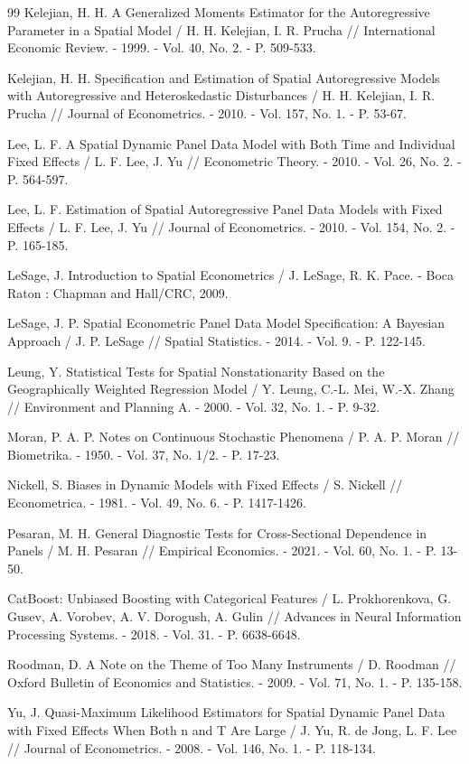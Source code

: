 \documentclass[12pt, a4paper]{article}
\begin{document}
\begin{thebibliography}{99}
    Kelejian, H. H. A Generalized Moments Estimator for the Autoregressive Parameter in a Spatial Model / H. H. Kelejian, I. R. Prucha // International Economic Review. - 1999. - Vol. 40, No. 2. - P. 509-533.

    Kelejian, H. H. Specification and Estimation of Spatial Autoregressive Models with Autoregressive and Heteroskedastic Disturbances / H. H. Kelejian, I. R. Prucha // Journal of Econometrics. - 2010. - Vol. 157, No. 1. - P. 53-67.

    Lee, L. F. A Spatial Dynamic Panel Data Model with Both Time and Individual Fixed Effects / L. F. Lee, J. Yu // Econometric Theory. - 2010. - Vol. 26, No. 2. - P. 564-597.

    Lee, L. F. Estimation of Spatial Autoregressive Panel Data Models with Fixed Effects / L. F. Lee, J. Yu // Journal of Econometrics. - 2010. - Vol. 154, No. 2. - P. 165-185.

    LeSage, J. Introduction to Spatial Econometrics / J. LeSage, R. K. Pace. - Boca Raton : Chapman and Hall/CRC, 2009.

    LeSage, J. P. Spatial Econometric Panel Data Model Specification: A Bayesian Approach / J. P. LeSage // Spatial Statistics. - 2014. - Vol. 9. - P. 122-145.

    Leung, Y. Statistical Tests for Spatial Nonstationarity Based on the Geographically Weighted Regression Model / Y. Leung, C.-L. Mei, W.-X. Zhang // Environment and Planning A. - 2000. - Vol. 32, No. 1. - P. 9-32.

    Moran, P. A. P. Notes on Continuous Stochastic Phenomena / P. A. P. Moran // Biometrika. - 1950. - Vol. 37, No. 1/2. - P. 17-23.

    Nickell, S. Biases in Dynamic Models with Fixed Effects / S. Nickell // Econometrica. - 1981. - Vol. 49, No. 6. - P. 1417-1426.

    Pesaran, M. H. General Diagnostic Tests for Cross-Sectional Dependence in Panels / M. H. Pesaran // Empirical Economics. - 2021. - Vol. 60, No. 1. - P. 13-50.

    CatBoost: Unbiased Boosting with Categorical Features / L. Prokhorenkova, G. Gusev, A. Vorobev, A. V. Dorogush, A. Gulin // Advances in Neural Information Processing Systems. - 2018. - Vol. 31. - P. 6638-6648.

    Roodman, D. A Note on the Theme of Too Many Instruments / D. Roodman // Oxford Bulletin of Economics and Statistics. - 2009. - Vol. 71, No. 1. - P. 135-158.

    Yu, J. Quasi-Maximum Likelihood Estimators for Spatial Dynamic Panel Data with Fixed Effects When Both n and T Are Large / J. Yu, R. de Jong, L. F. Lee // Journal of Econometrics. - 2008. - Vol. 146, No. 1. - P. 118-134.
\end{thebibliography}
\end{document}
